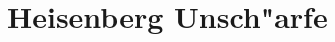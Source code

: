 \chapter{Heisenberg Unsch"arfe\label{chapter:heisenbergfourier}}
\begin{refsection}

\printbibliography[heading=subbibliography]
\end{refsection}

